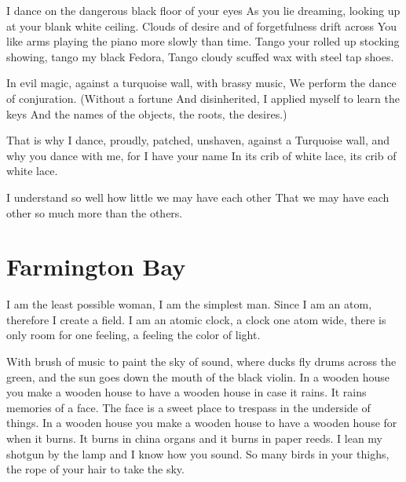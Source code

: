 \documentclass[english,11pt,letterpaper,onecolumn]{scrbook}
\begin{document}
\begin{poem}
\begin{stanza}
I dance on the dangerous black floor of your eyes\verseline
As you lie dreaming, looking up at your blank white ceiling.\verseline
Clouds of desire and of forgetfulness drift across\verseline
You like arms playing the piano more slowly than time.\verseline
Tango your rolled up stocking showing, tango my black Fedora,\verseline
Tango cloudy scuffed wax with steel tap shoes.
\end{stanza}

\begin{stanza}
In evil magic, against a turquoise wall, with brassy music,\verseline
We perform the dance of conjuration.  (Without a fortune\verseline
And disinherited, I applied myself to learn the keys\verseline
And the names of the objects, the roots, the desires.)
\end{stanza}

\begin{stanza}
That is why I dance, proudly, patched, unshaven, against a\verseline
Turquoise wall, and why you dance with me, for I have your name\verseline
In its crib of white lace, its crib of white lace.
\end{stanza}

\begin{stanza}
I understand so well how little we may have each other\verseline
That we may have each other so much more than the others.
\end{stanza}
\end{poem}

\newpage
\section{Farmington Bay}

\begin{poem}
\begin{stanza}
I am the least possible woman, I am the simplest man.\verseline
Since I am an atom, therefore I create a field.\verseline
I am an atomic clock, a clock one atom wide, there is only room for one feeling, a feeling the color of light.
\end{stanza}

\begin{stanza}
With brush of music to paint the sky of sound, where ducks fly drums across the green, and the sun goes down the mouth of the black violin.\verseline
In a wooden house you make a wooden house to have a wooden house in case it rains.  It rains memories of a face.  The face is a sweet place to trespass in the underside of things.\verseline
In a wooden house you make a wooden house to have a wooden house for when it burns.  It burns in china organs and it burns in paper reeds.  I lean my shotgun by the lamp and I know how you sound.\verseline
So many birds in your thighs, the rope of your hair to take the sky.
\end{stanza}
\end{poem}
\end{document}
